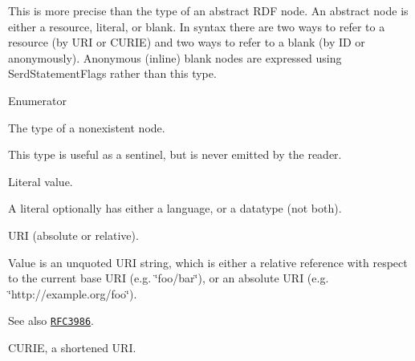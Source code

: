 This is more precise than the type of an abstract R\+DF node. An abstract node is either a resource, literal, or blank. In syntax there are two ways to refer to a resource (by U\+RI or C\+U\+R\+IE) and two ways to refer to a blank (by ID or anonymously). Anonymous (inline) blank nodes are expressed using Serd\+Statement\+Flags rather than this type. \begin{Desc}
\item[Enumerator]\par
\begin{description}
\item[{\em 
S\+E\+R\+D\+\_\+\+N\+O\+T\+H\+I\+NG\hypertarget{group__serd_gga7ccd8d4fb2c3a6ad690ed6d6fe1b45faa028984ec3afe86cc5acc79df3b279b28}{}\label{group__serd_gga7ccd8d4fb2c3a6ad690ed6d6fe1b45faa028984ec3afe86cc5acc79df3b279b28}
}]The type of a nonexistent node.

This type is useful as a sentinel, but is never emitted by the reader. \item[{\em 
S\+E\+R\+D\+\_\+\+L\+I\+T\+E\+R\+AL\hypertarget{group__serd_gga7ccd8d4fb2c3a6ad690ed6d6fe1b45faaa661a7e84228e32f0b979839658bf4c6}{}\label{group__serd_gga7ccd8d4fb2c3a6ad690ed6d6fe1b45faaa661a7e84228e32f0b979839658bf4c6}
}]Literal value.

A literal optionally has either a language, or a datatype (not both). \item[{\em 
S\+E\+R\+D\+\_\+\+U\+RI\hypertarget{group__serd_gga7ccd8d4fb2c3a6ad690ed6d6fe1b45faa7c01ef6de89d3245d4aed20da0736d24}{}\label{group__serd_gga7ccd8d4fb2c3a6ad690ed6d6fe1b45faa7c01ef6de89d3245d4aed20da0736d24}
}]U\+RI (absolute or relative).

Value is an unquoted U\+RI string, which is either a relative reference with respect to the current base U\+RI (e.\+g. \char`\"{}foo/bar\char`\"{}), or an absolute U\+RI (e.\+g. \char`\"{}http\+://example.\+org/foo\char`\"{}). \begin{DoxySeeAlso}{See also}
\href{http://tools.ietf.org/html/rfc3986}{\tt R\+F\+C3986}. 
\end{DoxySeeAlso}
\item[{\em 
S\+E\+R\+D\+\_\+\+C\+U\+R\+IE\hypertarget{group__serd_gga7ccd8d4fb2c3a6ad690ed6d6fe1b45faa8a72fff2f6f94adeb11ccadf12c117d8}{}\label{group__serd_gga7ccd8d4fb2c3a6ad690ed6d6fe1b45faa8a72fff2f6f94adeb11ccadf12c117d8}
}]C\+U\+R\+IE, a shortened U\+RI.


\end{description}
\end{Desc}
